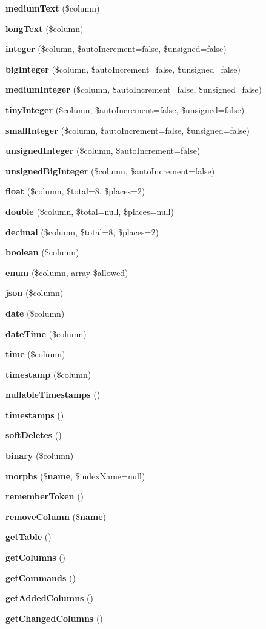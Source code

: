 \begin{DoxyCompactItemize}
{\bf medium\+Text} (\$column)
\item 
{\bf long\+Text} (\$column)
\item 
{\bf integer} (\$column, \$auto\+Increment=false, \$unsigned=false)
\item 
{\bf big\+Integer} (\$column, \$auto\+Increment=false, \$unsigned=false)
\item 
{\bf medium\+Integer} (\$column, \$auto\+Increment=false, \$unsigned=false)
\item 
{\bf tiny\+Integer} (\$column, \$auto\+Increment=false, \$unsigned=false)
\item 
{\bf small\+Integer} (\$column, \$auto\+Increment=false, \$unsigned=false)
\item 
{\bf unsigned\+Integer} (\$column, \$auto\+Increment=false)
\item 
{\bf unsigned\+Big\+Integer} (\$column, \$auto\+Increment=false)
\item 
{\bf float} (\$column, \$total=8, \$places=2)
\item 
{\bf double} (\$column, \$total=null, \$places=null)
\item 
{\bf decimal} (\$column, \$total=8, \$places=2)
\item 
{\bf boolean} (\$column)
\item 
{\bf enum} (\$column, array \$allowed)
\item 
{\bf json} (\$column)
\item 
{\bf date} (\$column)
\item 
{\bf date\+Time} (\$column)
\item 
{\bf time} (\$column)
\item 
{\bf timestamp} (\$column)
\item 
{\bf nullable\+Timestamps} ()
\item 
{\bf timestamps} ()
\item 
{\bf soft\+Deletes} ()
\item 
{\bf binary} (\$column)
\item 
{\bf morphs} (\${\bf name}, \$index\+Name=null)
\item 
{\bf remember\+Token} ()
\item 
{\bf remove\+Column} (\${\bf name})
\item 
{\bf get\+Table} ()
\item 
{\bf get\+Columns} ()
\item 
{\bf get\+Commands} ()
\item 
{\bf get\+Added\+Columns} ()
\item 
{\bf get\+Changed\+Columns} ()
\end{DoxyCompactItemize}
